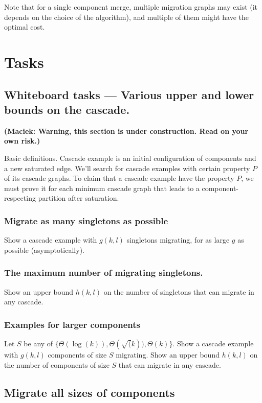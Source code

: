 \documentclass[a4paper,USenglish]{lipics-v2019}
\newcommand\maciek[1]{\color{brown}\textbf{(Maciek: #1)}\color{black}}
\begin{document}
Note that for a single component merge, multiple migration graphs may exist (it
depends on the choice of the algorithm), and multiple of them might have the optimal cost.

\section{Tasks}

\subsection{Whiteboard tasks --- Various upper and lower bounds on the cascade.}

\maciek{Warning, this section is under construction. Read on your own risk.}

Basic definitions.
Cascade example is an initial configuration of components and a new saturated edge.
We'll search for cascade examples with certain property $P$ of its cascade graphs.
To claim that a cascade example have the property $P$, we must prove it for each minimum cascade graph that leads to a component-respecting partition after saturation.

\subsubsection{Migrate as many singletons as possible}

Show a cascade example with $g(k,l)$ singletons migrating, for as large $g$ as possible (asymptotically).

\subsubsection{The maximum number of migrating singletons.}

Show an upper bound $h(k,l)$ on the number of singletons that can migrate in any cascade.

\subsubsection{Examples for larger components }

Let $S$ be any of $\{ \Theta(\log(k)), \Theta(\sqrt(k)), \Theta(k)\}$.
Show a cascade example with $g(k,l)$ components of size $S$ migrating.
Show an upper bound $h(k,l)$ on the number of components of size $S$ that can migrate in any cascade.

\subsection{Migrate all sizes of components}
\end{document}
